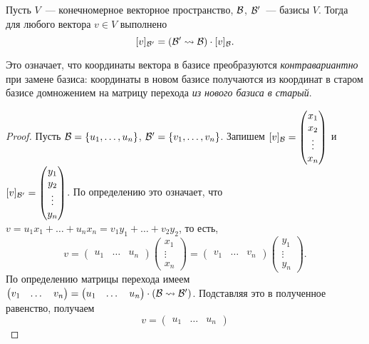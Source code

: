 \begin{theorem}\label{thm:change_of_coordinates}
Пусть $V$~--- конечномерное векторное пространство, $\mathcal B$, $\mathcal
B'$~--- базисы $V$. Тогда для любого вектора $v\in V$ выполнено
$$
[v]_{\mathcal B'} = (\mathcal B'\rightsquigarrow\mathcal B)\cdot [v]_{\mathcal B}.
$$
\end{theorem}
\begin{remark}\label{rem:contravariant_change}
Это означает, что координаты вектора в базисе преобразуются
{\em контравариантно} при замене базиса: координаты в новом базисе
получаются из координат в старом базисе домножением на матрицу
перехода {\em из нового базиса в старый}.
\end{remark}
\begin{proof}
Пусть $\mathcal B=\{u_1,\dots,u_n\}$, $\mathcal B'=\{v_1,\dots,v_n\}$.
Запишем $[v]_{\mathcal B} =
\begin{pmatrix} x_1 \\ x_2 \\ \vdots \\ x_n\end{pmatrix}$ и
$[v]_{\mathcal B'} = 
\begin{pmatrix} y_1 \\ y_2 \\ \vdots \\ y_n\end{pmatrix}$.
По определению это означает,
что $v = u_1x_1+\dots+u_nx_n = v_1y_1+\dots+v_2y_2$,
то есть,
$$v=\begin{pmatrix}u_1 & \dots & u_n\end{pmatrix}
\begin{pmatrix}x_1 \\ \vdots \\ x_n\end{pmatrix} = 
\begin{pmatrix}v_1 & \dots & v_n\end{pmatrix}
\begin{pmatrix}y_1 \\ \vdots \\ y_n\end{pmatrix}.$$
По определению матрицы перехода имеем
$\begin{pmatrix}v_1 & \dots & v_n\end{pmatrix}
=\begin{pmatrix}u_1 & \dots & u_n\end{pmatrix}
\cdot (\mathcal B\rightsquigarrow\mathcal B')$.
Подставляя это в полученное равенство, получаем
$$
v=\begin{pmatrix}u_1 & \dots & u_n\end{pmatrix}
$$
\end{proof}

